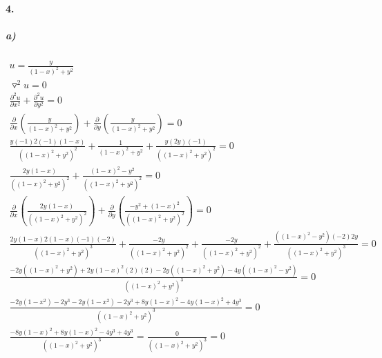 \documentclass[11pt, A4paper,norsk]{article}
\begin{document}
		\paragraph{4.}
			\subparagraph{a)}
				\begin{gather}
u = \frac{y}{(1 - x)^2 + y^2} \\
\triangledown^2 u = 0 \\
\frac{\partial^2 u}{\partial x^2} + \frac{\partial^2 u}{\partial y^2} = 0 \\
\frac{\partial}{\partial x}\left( \frac{y}{(1 - x)^2 + y^2} \right) + \frac{\partial}{\partial y} \left( \frac{y}{(1 - x)^2 + y^2} \right) = 0 \\
\frac{y(-1)2(-1)(1 - x)}{\left( (1 - x)^2 + y^2 \right)^2} + \frac{1}{(1 - x)^2 + y^2} + \frac{y(2y)(-1)}{\left( (1 - x)^2 + y^2 \right)^2} = 0\\
\frac{2y(1 - x)}{\left( (1 - x)^2 + y^2 \right)^2} + \frac{(1 - x)^2 - y^2}{\left( (1 - x)^2 + y^2 \right)^2} = 0 \\
\frac{\partial}{\partial x} \left( \frac{2y(1 - x)}{\left( (1 - x)^2 + y^2 \right)^2} \right) + \frac{\partial}{\partial y} \left( \frac{-y^2 + (1 - x)^2}{\left( (1 - x)^2 + y^2 \right)^2} \right) = 0 \\
\frac{2y(1 - x)2(1 - x)(-1)(-2)}{\left( (1 - x)^2 + y^2 \right)^3} + \frac{-2y}{\left( (1 - x)^2 + y^2 \right)^2} + \frac{-2y}{\left( (1 - x)^2 + y^2 \right)^2} + \frac{\left( (1 - x)^2 - y^2 \right)(-2)2y}{\left( (1 - x)^2 + y^2 \right)^3} = 0 \nonumber \\
\frac{-2y\left( (1 - x)^2 + y^2 \right) + 2y(1 - x)^2(2)(2) - 2y\left( (1 - x)^2 + y^2 \right) - 4y\left( (1 - x)^2 - y^2 \right)}{\left( (1 - x)^2 + y^2 \right)^3} = 0 \nonumber \\
\frac{-2y(1 - x^2) -2y^3 - 2y(1 - x^2) - 2y^3 + 8y(1 - x)^2 - 4y(1 - x)^2 + 4y^3}{\left( (1 - x)^2 + y^2 \right)^3} = 0 \nonumber \\
\frac{- 8y(1 - x)^2 + 8y(1 - x)^2 - 4y^3 + 4y^3}{\left( (1 - x)^2 + y^2 \right)^3} = \frac{0}{\left( (1 - x)^2 + y^2 \right)^3} = 0
				\end{gather}
\end{document}
